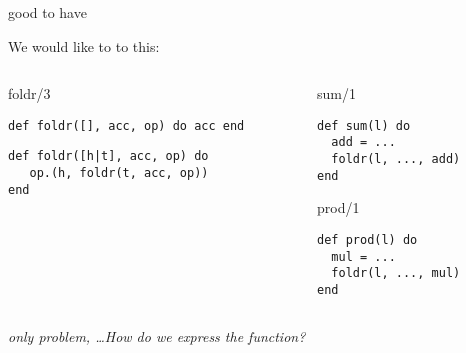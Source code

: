 \begin{frame}[fragile]{good to have}

We would like to to this:

\pause\vspace{20pt}

\begin{columns}
   \begin{column}{.5\linewidth}
     \begin{block}{foldr/3}
       \begin{verbatim}
def foldr([], acc, op) do acc end
       \end{verbatim}
\pause
       \begin{verbatim}
def foldr([h|t], acc, op) do
   op.(h, foldr(t, acc, op))
end
      \end{verbatim}
       \vfill
     \end{block}
   \end{column}
\pause
   \begin{column}{.5\linewidth}
     \begin{block}{sum/1}
       \begin{verbatim}
def sum(l) do
  add = ... 
  foldr(l, ..., add)
end
       \end{verbatim}
     \end{block}
\pause     
   \begin{block}{prod/1}
       \begin{verbatim}
def prod(l) do
  mul = ... 
  foldr(l, ..., mul)
end
       \end{verbatim}
     \end{block}
   \end{column}
  \end{columns}

\pause\vspace{20pt}
{\em only problem, \ldots How do we express the function?}

\end{frame}

